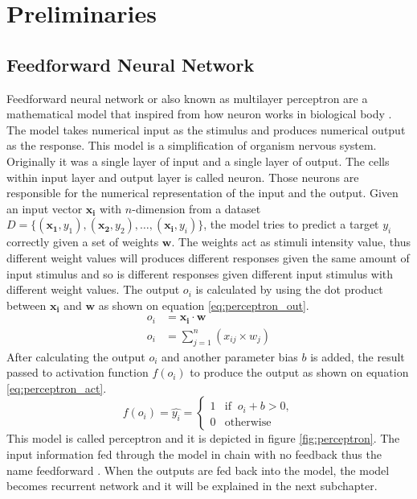 \chapter{Preliminaries}
\label{chap:preliminaries}

\section{Feedforward Neural Network}
    Feedforward neural network or also known as multilayer perceptron
    are a mathematical model that inspired from how neuron works in
    biological body \citep{Goodfellow-et-al-2016}. The model takes
    numerical input as the stimulus and produces numerical output as
    the response. This model is a simplification of organism nervous
    system. Originally it was a single layer of input and a single
    layer of output. The cells within input layer and output layer is
    called neuron. Those neurons are responsible for the numerical
    representation of the input and the output. Given an input vector
    $\mathbf{x_i}$ with $n$-dimension from a dataset $D =
    \{(\mathbf{x_1}, y_1), (\mathbf{x_2}, y_2), \dots, (\mathbf{x_i},
    y_i)\}$, the model tries to predict a target $y_i$ correctly given
    a set of weights $\mathbf{w}$. The weights act as stimuli
    intensity value, thus different weight values will produces
    different responses given the same amount of input stimulus and so
    is different responses given different input stimulus with
    different weight values. The output $o_i$ is calculated by using
    the dot product between $\mathbf{x_i}$ and $\mathbf{w}$ as shown
    on equation \ref{eq:perceptron_out}. 
    \begin{align}
        \label{eq:perceptron_out}
        o_i &= \mathbf{x_i} \cdot \mathbf{w} \\
        o_i &= \sum_{j=1}^n (x_{ij} \times w_j)
    \end{align}
    After calculating the output $o_i$ and another parameter bias $b$ is
    added, the result passed to activation function $f(o_i)$ to produce
    the output as shown on equation
    \ref{eq:perceptron_act}.
    \begin{equation}
        \label{eq:perceptron_act}
        f(o_i) = \hat{y_i} =
        \begin{cases}
            1 & \text{if }\ o_i + b > 0,\\
            0 & \text{otherwise}
        \end{cases}
    \end{equation}
    This model is called perceptron and it is depicted in figure
    \ref{fig:perceptron}. The input information fed through the model
    in chain with no feedback thus the name feedforward
    \citep{Goodfellow-et-al-2016}. When the outputs are fed back into
    the model, the model becomes recurrent network and it will be
    explained in the next subchapter.

